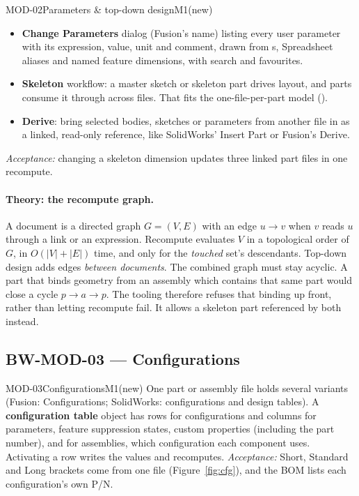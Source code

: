 \begin{epic}{MOD-02}{Parameters \& top-down design}{M1}{\stTodo}{(new)}
\begin{itemize}
  \item \textbf{Change Parameters} dialog (Fusion's name) listing every user parameter with its expression,
        value, unit and comment, drawn from s, Spreadsheet aliases and named feature
        dimensions, with search and favourites.
  \item \textbf{Skeleton} workflow: a master sketch or skeleton part drives layout, and parts consume it
        through  across files. That fits the one-file-per-part model ().
  \item \textbf{Derive}: bring selected bodies, sketches or parameters from another file in as a linked,
        read-only reference, like SolidWorks' Insert Part or Fusion's Derive.
\end{itemize}
\emph{Acceptance:} changing a skeleton dimension updates three linked part files in one recompute.
\end{epic}

\paragraph{Theory: the recompute graph.} A document is a directed graph $G=(V,E)$ with an edge $u\to v$
when $v$ reads $u$ through a link or an expression. Recompute evaluates $V$ in a topological order of $G$,
in $O(|V|+|E|)$ time, and only for the \emph{touched} set's descendants. Top-down design adds edges
\emph{between documents}. The combined graph must stay acyclic. A part that binds geometry from an assembly
which contains that same part would close a cycle $p\to a\to p$. The tooling therefore refuses that
binding up front, rather than letting recompute fail. It allows a skeleton part referenced by both instead.

\subsection{BW-MOD-03 --- Configurations}

\begin{epic}{MOD-03}{Configurations}{M1}{\stTodo}{(new)}
One part or assembly file holds several variants (Fusion: Configurations; SolidWorks: configurations and
design tables). A \textbf{configuration table} object has rows for configurations and columns for parameters,
feature suppression states, custom properties (including the part number), and for assemblies, which
configuration each component uses. Activating a row writes the values and recomputes.
\emph{Acceptance:} Short, Standard and Long brackets come from one file
(Figure~\ref{fig:cfg}), and the BOM lists each configuration's own P/N.
\end{epic}

